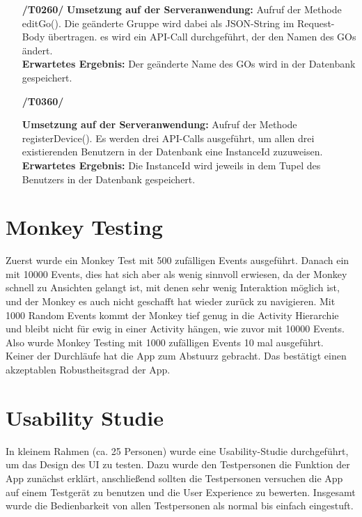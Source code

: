 \documentclass[11pt,a4paper]{scrartcl}
\begin{document}
\begin{enumerate}
	\item[\textbf{/T0260/}]
	\textbf{Umsetzung auf der Serveranwendung: }Aufruf der Methode editGo(). Die geänderte Gruppe wird dabei als JSON-String im Request-Body übertragen. es wird ein API-Call durchgeführt, der den Namen des GOs ändert.\\
	\textbf{Erwartetes Ergebnis: }Der geänderte Name des GOs wird in der Datenbank gespeichert.
	
	\item[\textbf{/T0360/}]

	\textbf{Umsetzung auf der Serveranwendung: }Aufruf der Methode registerDevice(). Es werden drei API-Calls ausgeführt, um allen drei existierenden Benutzern in der Datenbank eine InstanceId zuzuweisen.\\
	\textbf{Erwartetes Ergebnis: }Die InstanceId wird jeweils in dem Tupel des Benutzers in der Datenbank gespeichert.
	
\end{enumerate}

\newpage

\section{Monkey Testing}

Zuerst wurde ein Monkey Test mit 500 zufälligen Events ausgeführt. Danach ein mit 10000 Events, dies hat sich aber als wenig sinnvoll erwiesen, da der Monkey schnell zu Ansichten gelangt ist, mit denen sehr wenig Interaktion möglich ist, und der Monkey es auch nicht geschafft hat wieder zurück zu navigieren. Mit 1000 Random Events kommt der Monkey tief genug in die Activity Hierarchie und bleibt nicht für ewig in einer Activity hängen, wie zuvor mit 10000 Events. Also wurde Monkey Testing mit 1000 zufälligen Events 10 mal ausgeführt.\\

Keiner der Durchläufe hat die App zum Abstuurz gebracht. Das bestätigt einen akzeptablen Robustheitsgrad der App.

\section{Usability Studie}
In kleinem Rahmen (ca. 25 Personen) wurde eine Usability-Studie durchgeführt, um das Design des UI zu testen. Dazu wurde den Testpersonen die Funktion der App zunächst erklärt, anschließend sollten die Testpersonen versuchen die App auf einem Testgerät zu benutzen und die User Experience zu bewerten.
Insgesamt wurde die Bedienbarkeit von allen Testpersonen als normal bis einfach eingestuft.\\
\end{document}
